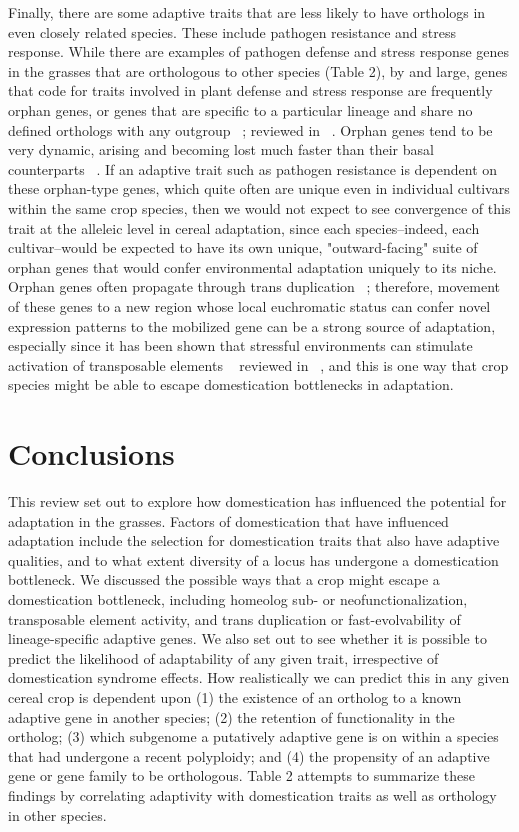 \documentclass[12pt]{article}
\begin{document}
Finally, there are some adaptive traits that are less likely to have orthologs in even closely related species. These include pathogen resistance and stress response. While there are examples of pathogen defense and stress response genes in the grasses that are orthologous to other species (Table 2), by and large, genes that code for traits involved in plant defense and stress response are frequently orphan genes, or genes that are specific to a particular lineage and share no defined orthologs with any outgroup ~\citep{Woodhouse2011}; reviewed in ~\citep{Arendsee2014}. Orphan genes tend to be very dynamic, arising and becoming lost much faster than their basal counterparts ~\citep{Freeling2008}.  If an adaptive trait such as pathogen resistance is dependent on these orphan-type genes, which quite often are unique even in individual cultivars within the same crop species, then we would not expect to see convergence of this trait at the alleleic level in cereal adaptation, since each species--indeed, each cultivar--would be expected to have its own unique, "outward-facing" suite of orphan genes that would confer environmental adaptation uniquely to its niche. Orphan genes often propagate through trans duplication ~\citep{Freeling2008, Arendsee2014}; therefore, movement of these genes to a new region whose local euchromatic status can confer novel expression patterns to the mobilized gene can be a strong source of adaptation, especially since it has been shown that stressful environments can stimulate activation of transposable elements ~\citep{Beguiristain2001, Makarevitch2015}  reviewed in ~\citep{Negi2016}, and this is one way that crop species might be able to escape domestication bottlenecks in adaptation.

\section*{Conclusions}
This review set out to explore how domestication has influenced the potential for adaptation in the grasses.  Factors of domestication that have influenced adaptation include the selection for domestication traits that also have adaptive qualities, and to what extent diversity of a locus has undergone a domestication bottleneck. We discussed the possible ways that a crop might escape a domestication bottleneck, including homeolog sub- or neofunctionalization, transposable element activity, and trans duplication or fast-evolvability of lineage-specific adaptive genes. We also set out to see whether it is possible to predict the likelihood of adaptability of any given trait, irrespective of domestication syndrome effects. How realistically we can predict this in any given cereal crop is dependent upon  (1) the existence of an ortholog to a known adaptive gene in another species; (2) the retention of functionality in the ortholog; (3)  which subgenome a putatively adaptive gene is on within a species that had undergone a recent polyploidy; and (4) the propensity of an adaptive gene or gene family to be orthologous.   Table 2 attempts to summarize these findings by correlating adaptivity with domestication traits as well as orthology in other species.  




\end{document}
